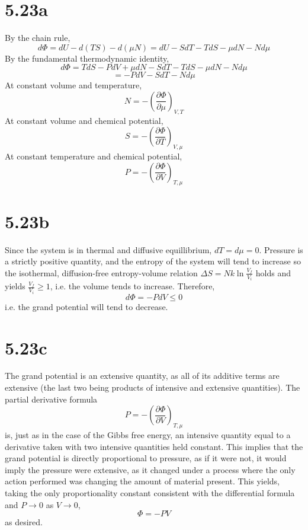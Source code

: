 \documentclass{article}
\begin{document}
\section*{5.23a}
By the chain rule,
\[d\Phi=dU-d(TS)-d(\mu N)=dU-SdT-TdS-\mu dN-Nd\mu\]
By the fundamental thermodynamic identity,
\[d\Phi= TdS-PdV+\mu dN-SdT-TdS-\mu dN-Nd\mu\]
\[=-PdV-SdT-Nd\mu\]
At constant volume and temperature,
\[N=-\left( \frac{\partial \Phi}{\partial \mu} \right)_{V,T}\]
At constant volume and chemical potential,
\[S=-\left( \frac{\partial \Phi}{\partial T} \right)_{V,\mu}\]
At constant temperature and chemical potential,
\[P=-\left( \frac{\partial \Phi}{\partial V} \right)_{T,\mu}\]

\section*{5.23b}
Since the system is in thermal and diffusive equillibrium, $dT=d\mu=0$. Pressure is a strictly positive quantity, and the entropy of the system will tend to increase so the isothermal, diffusion-free entropy-volume relation $\Delta S=Nk\ln\frac{V_{f}}{V_{i}}$ holds and yields $\frac{V_{f}}{V_{i}}\geq 1$, i.e. the volume tends to increase. Therefore,
\[d\Phi=-PdV\leq 0\]
i.e. the grand potential will tend to decrease.

\section*{5.23c}
The grand potential is an extensive quantity, as all of its additive terms are extensive (the last two being products of intensive and extensive quantities). The partial derivative formula
\[P=-\left( \frac{\partial \Phi}{\partial V} \right)_{T,\mu}\]
is, just as in the case of the Gibbs free energy, an intensive quantity equal to a derivative taken with two intensive quantities held constant. This implies that the grand potential is directly proportional to pressure, as if it were not, it would imply the pressure were extensive, as it changed under a process where the only action performed was changing the amount of material present. This yields, taking the only proportionality constant consistent with the differential formula and $P\to 0$ as $V\to 0$,
\[\Phi=-PV\]
as desired.
\end{document}
